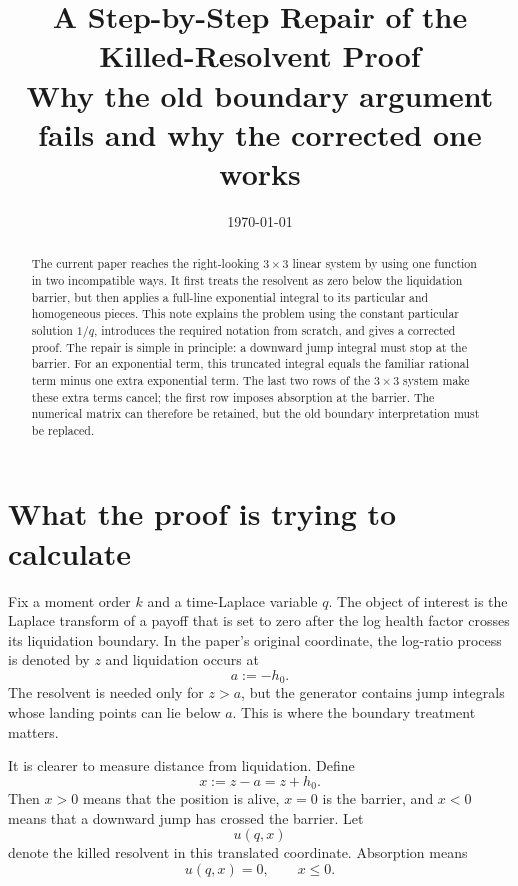 \documentclass[11pt]{article}
\title{A Step-by-Step Repair of the Killed-Resolvent Proof\\
\large Why the old boundary argument fails and why the corrected one works}
\author{}
\date{\today}
\theoremstyle{plain}
\theoremstyle{remark}
\begin{document}
\maketitle

\begin{abstract}
The current paper reaches the right-looking $3\times3$ linear system by using
one function in two incompatible ways.  It first treats the resolvent as zero
below the liquidation barrier, but then applies a full-line exponential
integral to its particular and homogeneous pieces.  This note explains the
problem using the constant particular solution $1/q$, introduces the required
notation from scratch, and gives a corrected proof.  The repair is simple in
principle: a downward jump integral must stop at the barrier.  For an
exponential term, this truncated integral equals the familiar rational term
minus one extra exponential term.  The last two rows of the $3\times3$ system
make these extra terms cancel; the first row imposes absorption at the
barrier.  The numerical matrix can therefore be retained, but the old
boundary interpretation must be replaced.
\end{abstract}

\section{What the proof is trying to calculate}

Fix a moment order $k$ and a time-Laplace variable $q$.  The object of interest
is the Laplace transform of a payoff that is set to zero after the log health
factor crosses its liquidation boundary.  In the paper's original coordinate,
the log-ratio process is denoted by $z$ and liquidation occurs at
\[
a:=-h_0.
\]
The resolvent is needed only for $z>a$, but the generator contains jump
integrals whose landing points can lie below $a$.  This is where the boundary
treatment matters.

It is clearer to measure distance from liquidation.  Define
\begin{equation}\label{eq:x-definition}
x:=z-a=z+h_0.
\end{equation}
Then $x>0$ means that the position is alive, $x=0$ is the barrier, and $x<0$
means that a downward jump has crossed the barrier.  Let
\[
u(q,x)
\]
denote the killed resolvent in this translated coordinate.  Absorption means
\begin{equation}\label{eq:killed-extension}
u(q,x)=0,\qquad x\leq0.
\end{equation}
\end{document}
